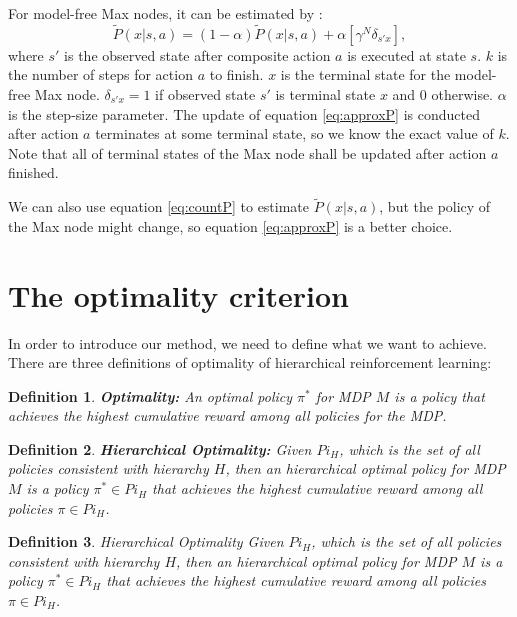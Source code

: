 \documentclass{article} %
\newtheorem{definition}{Definition}
\begin{document}
For model-free Max nodes, it can be estimated by \cite{option}:
\begin{equation}
    \tilde{P}(x|s, a) = (1-\alpha)\tilde{P}(x|s, a) + \alpha [ \gamma^N \delta_{s'x}],
    \label{eq:approxP}
\end{equation}
where $s'$ is the observed state after composite action $a$ is executed at state $s$.
$k$ is the number of steps for action $a$ to finish. 
$x$ is the terminal state for the model-free Max node. $\delta_{s'x}=1$ if observed state $s'$
is terminal state $x$ and 0 otherwise.
$\alpha$ is the step-size parameter.
The update of equation \ref{eq:approxP} is conducted after action $a$ terminates at some terminal state,
so we know the exact value of $k$. Note that all of terminal states of the Max node shall be updated after 
action $a$ finished.

We can also use equation \ref{eq:countP} to estimate $\tilde{P}(x|s, a)$, but the policy of the Max node
might change, so equation \ref{eq:approxP} is a better choice.

\section{The optimality criterion}
In order to introduce our method, we need to define what we want to achieve.
There are three definitions of optimality of hierarchical reinforcement learning:

\begin{definition}
    \textbf{Optimality:} An optimal policy $\pi^*$ for MDP $M$ is a policy that achieves the highest cumulative reward
    among all policies for the MDP.
\end{definition}
\begin{definition}
    \textbf{Hierarchical Optimality:} Given $Pi_H$, which is the set of all policies consistent with hierarchy $H$, 
    then an hierarchical optimal policy for MDP $M$ is a policy $\pi^* \in Pi_H$ that achieves the highest cumulative reward
    among all policies $\pi \in Pi_H$.
\end{definition}
\begin{definition}
    Hierarchical Optimality Given $Pi_H$, which is the set of all policies consistent with hierarchy $H$, 
    then an hierarchical optimal policy for MDP $M$ is a policy $\pi^* \in Pi_H$ that achieves the highest cumulative reward
    among all policies $\pi \in Pi_H$.
\end{definition}
\end{document}
